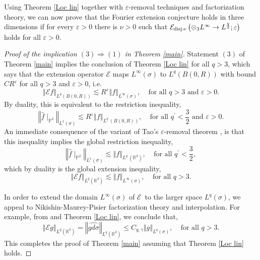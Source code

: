 \documentclass{amsart}%
\theoremstyle{plain}
\numberwithin{equation}{section}
\begin{document}
Using Theorem \ref{Loc lin} together with $\varepsilon$-removal techniques and
factorization theory, we can now prove that the Fourier extension conjecture
holds in three dimensions if for every $\varepsilon>0$ there is $\nu>0$ such
that $\mathcal{E}_{\mathop{\rm disj}\nu}\left(  \otimes_{3}L^{\infty
}\rightarrow L^{\frac{q}{3}};\varepsilon\right)  $ holds for all
$\varepsilon>0$.

\begin{proof}
[Proof of the implication $\left(  3\right)  \Longrightarrow\left(  1\right)
$ in Theorem \ref{main}]Statement $\left(  3\right)  $ of Theorem \ref{main}
implies the conclusion of Theorem \ref{Loc lin} for all $q>3$, which says that
the extension operator $\mathcal{E}$ maps $L^{\infty}\left(  \sigma\right)  $
to $L^{q}\left(  B\left(  0,R\right)  \right)  $ with bound $CR^{\varepsilon}$
for all $q>3$ and $\varepsilon>0$, i.e.%
\[
\left\Vert \mathcal{E}f\right\Vert _{L^{q}\left(  B\left(  0,R\right)
\right)  }\lesssim R^{\varepsilon}\left\Vert f\right\Vert _{L^{\infty}\left(
\sigma\right)  },\ \ \ \ \ \text{for all }q>3\text{ and }\varepsilon>0.
\]
By duality, this is equivalent to the restriction inequality,%
\[
\left\Vert \widehat{f}\mid_{\mathbb{P}^{2}}\right\Vert _{L^{1}\left(
\sigma\right)  }\lesssim R^{\varepsilon}\left\Vert f\right\Vert _{L^{q^{\prime
}}\left(  B\left(  0,R\right)  \right)  },\ \ \ \ \ \text{for all }q^{\prime
}<\frac{3}{2}\text{ and }\varepsilon>0.
\]
An immediate consequence of the variant \cite[Lemma A1]{BoGu} of Tao's
$\varepsilon$-removal theorem \cite[Theorem 1.2]{Tao}, is that this inequality
implies the global restriction inequality,%
\[
\left\Vert \widehat{f}\mid_{\mathbb{P}^{2}}\right\Vert _{L^{1}\left(
\sigma\right)  }\lesssim\left\Vert f\right\Vert _{L^{q^{\prime}}\left(
\mathbb{R}^{3}\right)  },\ \ \ \ \ \text{for all }q^{\prime}<\frac{3}{2},
\]
which by duality is the global extension inequality,%
\[
\left\Vert \mathcal{E}f\right\Vert _{L^{q}\left(  \mathbb{R}^{3}\right)
}\lesssim\left\Vert f\right\Vert _{L^{\infty}\left(  \sigma\right)
},\ \ \ \ \ \text{for all }q>3.
\]


In order to extend the domain $L^{\infty}\left(  \sigma\right)  $ of
$\mathcal{E}$\ to the larger space $L^{q}\left(  \sigma\right)  $, we appeal
to Nikishin-Maurey-Pisier factorization theory and interpolation. For example,
from \cite[Corollary 1.4 and Remark 1.5]{Bus} and Theorem \ref{Loc lin}, we
conclude that,%
\[
\left\Vert \mathcal{E}g\right\Vert _{L^{q}\left(  \mathbb{R}^{3}\right)
}=\left\Vert \widehat{gd\sigma}\right\Vert _{L^{q}\left(  \mathbb{R}%
^{3}\right)  }\leq C_{q,\gamma}\left\Vert g\right\Vert _{L^{q}\left(
\sigma\right)  },\ \ \ \ \ \text{for all }q>3.
\]
This completes the proof of Theorem \ref{main} assuming that Theorem
\ref{Loc lin} holds.
\end{proof}
\end{document}

